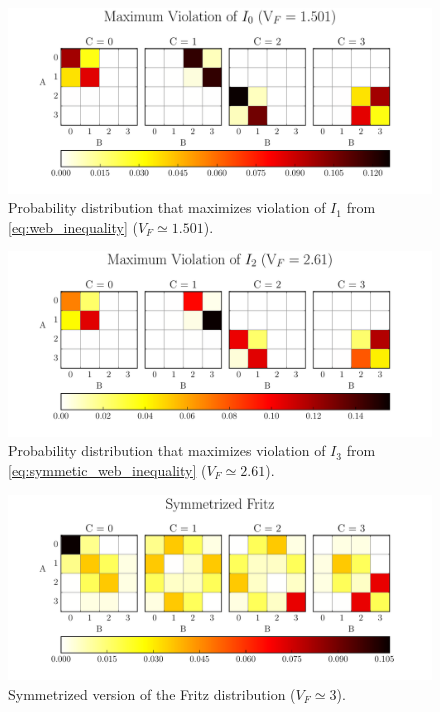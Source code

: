 \documentclass[aps, 10pt, english, twoside, pra, nofootinbib, tightenlines, longbibliography, superscriptaddress]{revtex4-1}
\begin{document}
    \begin{figure}
    \begin{center}
            \includegraphics[scale=0.6,trim={0 0 0 0.4in},clip]{../../figures/distributions/plotted_dist_I_1_max_violation_2017.pdf}
            \caption{Probability distribution that maximizes violation of $I_1$ from \cref{eq:web_inequality} ($V_F \simeq 1.501$).}
            \label{fig:maximum_violation_I_1}
    \end{center}
    \end{figure}
    \begin{figure}
    \begin{center}
            \includegraphics[scale=0.6,trim={0 0 0 0.4in},clip]{../../figures/distributions/plotted_dist_I_3_max_violation_2017.pdf}
            \caption{Probability distribution that maximizes violation of $I_3$ from \cref{eq:symmetic_web_inequality} ($V_F \simeq 2.61$).}
            \label{fig:maximum_violation_I_3}
    \end{center}
    \end{figure}
    \begin{figure}
    \begin{center}
            \includegraphics[scale=0.6,trim={0 0 0 0.4in},clip]{../../figures/distributions/symmetrized_fritz.pdf}
            \caption{Symmetrized version of the Fritz distribution ($V_F \simeq 3$).}
            \label{fig:symmetrized_fritz}
    \end{center}
    \end{figure}
\end{document}
